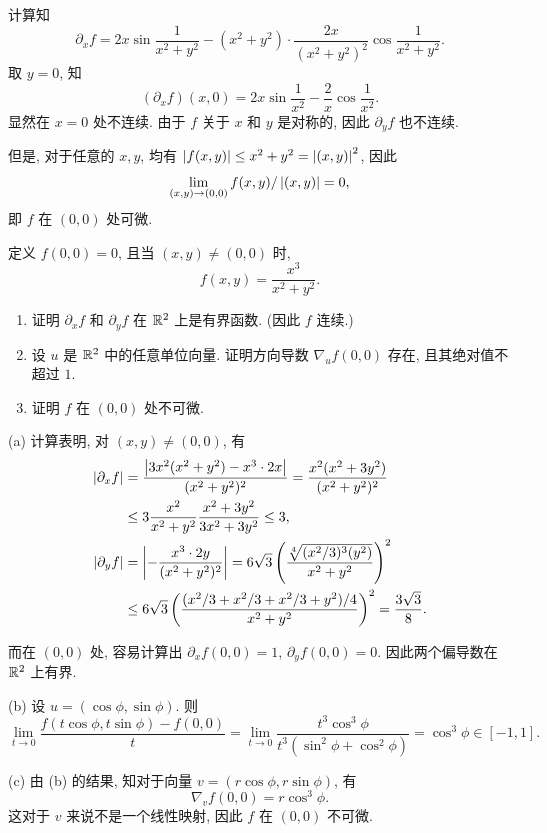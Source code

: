 \documentclass{article}
\begin{document}
\begin{solution}
	计算知
	\[ \partial_xf = 2x \sin \frac{1}{x^2+y^2} - (x^2+y^2) \cdot \frac{2x}{(x^2+y^2)^2} \cos \frac{1}{x^2+y^2}.  \]
	取 $y=0$, 知
	\[ (\partial_xf)(x,0) = 2x\sin \frac{1}{x^2} - \frac{2}{x} \cos \frac{1}{x^2}. \]
	显然在 $x=0$ 处不连续. 由于 $f$ 关于 $x$ 和 $y$ 是对称的, 因此 $\partial_yf$ 也不连续.

	但是, 对于任意的 $x,y$, 均有 $\left|f(x,y)\right| \le x^2+y^2 = \left|(x,y)\right|^2$, 因此 
	\[ \lim_{(x,y) \to (0,0)}f(x,y)/\left|(x,y)\right| = 0, \]
	即 $f$ 在 $(0,0)$ 处可微.
\end{solution}



\begin{problem}
  定义 $f(0,0)=0$, 且当 $(x,y)\ne(0,0)$ 时,
  \[
    f(x,y)=\frac{x^3}{x^2+y^2}.
  \]
  \begin{enumerate}
    \item[(a)] 证明 $\partial_x f$ 和 $\partial_y f$ 在 $\mathbb{R}^2$ 上是有界函数. (因此 $f$ 连续.)
    \item[(b)] 设 $u$ 是 $\mathbb{R}^2$ 中的任意单位向量. 证明方向导数 $\nabla_u f(0,0)$ 存在, 且其绝对值不超过 $1$.
    \item[(c)] 证明 $f$ 在 $(0,0)$ 处不可微.
  \end{enumerate}
\end{problem}

\begin{solution}
	(a) 计算表明, 对 $(x,y) \neq (0,0)$, 有
	\begin{align*}
		\left|\partial_x f\right|
		&= \frac{\left|3x^2(x^2+y^2) - x^3\cdot 2x\right|}{(x^2+y^2)^2} 
		= \frac{x^2(x^2+3y^2)}{(x^2+y^2)^2} \\
		&\le 3 \frac{x^2}{x^2+y^2} \frac{x^2+3y^2}{3x^2+3y^2} \le 3, \\
		\left|\partial_y f\right|
		&= \left|-\frac{x^3\cdot 2y}{(x^2+y^2)^2}\right|
		= 6\sqrt{3}\left( \frac{\sqrt[4]{(x^2/3)^3(y^2)}}{x^2+y^2} \right)^2 \\
		&\le 6\sqrt{3}\left( \frac{(x^2/3+x^2/3+x^2/3+y^2)/4}{x^2+y^2} \right)^2
		= \frac{3\sqrt{3}}{8}.
	\end{align*}

	而在 $(0,0)$ 处, 容易计算出 $\partial_xf(0,0) = 1$, $\partial_y f(0,0)=0$. 因此两个偏导数在 $\mathbb{R}^2$ 上有界.

	(b) 设 $u = (\cos \phi, \sin\phi)$. 则
	\[ \lim_{t \to 0}\frac{f(t\cos\phi,t\sin\phi) - f(0,0)}{t}
	=\lim_{t \to 0} \frac{t^3 \cos^3\phi}{t^3(\sin^2\phi + \cos^2\phi)}
	= \cos^3 \phi \in [-1,1]. \]

	(c) 由 (b) 的结果, 知对于向量 $v = (r\cos\phi,r\sin\phi)$, 有
	\[ \nabla_vf(0,0) = r\cos^3\phi. \]
	这对于 $v$ 来说不是一个线性映射, 因此 $f$ 在 $(0,0)$ 不可微.
\end{solution}
\end{document}
